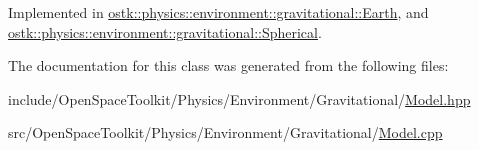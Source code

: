 Implemented in \hyperlink{classostk_1_1physics_1_1environment_1_1gravitational_1_1_earth_a9e536649566761f4bdd467993abfcedd}{ostk\+::physics\+::environment\+::gravitational\+::\+Earth}, and \hyperlink{classostk_1_1physics_1_1environment_1_1gravitational_1_1_spherical_a37243cf671418b0cb9eff229101b5e96}{ostk\+::physics\+::environment\+::gravitational\+::\+Spherical}.



The documentation for this class was generated from the following files\+:\begin{DoxyCompactItemize}
\item 
include/\+Open\+Space\+Toolkit/\+Physics/\+Environment/\+Gravitational/\hyperlink{_gravitational_2_model_8hpp}{Model.\+hpp}\item 
src/\+Open\+Space\+Toolkit/\+Physics/\+Environment/\+Gravitational/\hyperlink{_gravitational_2_model_8cpp}{Model.\+cpp}\end{DoxyCompactItemize}
